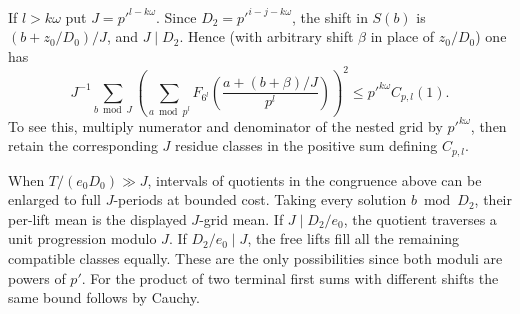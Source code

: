 \documentclass[11pt,a4paper]{article}
\theoremstyle{paperplain}
\numberwithin{equation}{section}
\begin{document}
If \(l>k\omega\) put \(J=p'^{l-k\omega}\).
Since \(D_2=p'^{i-j-k\omega}\), the shift in \(S(b)\) is
\((b+z_0/D_0)/J\), and \(J\mid D_2\). Hence (with arbitrary
shift \(\beta\) in place of \(z_0/D_0\)) one has
\[
 J^{-1}\sum_{b\bmod J}
 \left(\sum_{a\bmod p^l} F_{6^l}
    \left(\frac{a+(b+\beta)/J}{p^l}\right)\right)^2
 \le p'^{k\omega} C_{p,l}(1).
\]
To see this, multiply numerator and denominator of the nested
grid by \(p'^{k\omega}\), then retain the corresponding
\(J\) residue classes in the positive sum defining \(C_{p,l}\).

When \(T/(e_0D_0)\gg J\), intervals of quotients in the
congruence above can be enlarged to full \(J\)-periods
at bounded cost. Taking every solution \(b\bmod D_2\),
their per-lift mean is the displayed \(J\)-grid mean.
If \(J\mid D_2/e_0\), the quotient traverses a unit
progression modulo \(J\). If \(D_2/e_0\mid J\), the free
lifts fill all the remaining compatible classes equally.
These are the only possibilities since both moduli are
powers of \(p'\). For the product of two terminal first
sums with different shifts the same bound follows by Cauchy.
\end{document}
